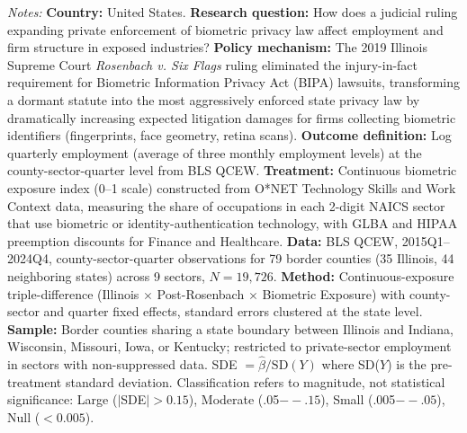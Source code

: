 \begin{table}[htbp]
\begin{tablenotes}[flushleft]
\item \textit{Notes:} \textbf{Country:} United States. \textbf{Research question:} How does a judicial ruling expanding private enforcement of biometric privacy law affect employment and firm structure in exposed industries? \textbf{Policy mechanism:} The 2019 Illinois Supreme Court \textit{Rosenbach v. Six Flags} ruling eliminated the injury-in-fact requirement for Biometric Information Privacy Act (BIPA) lawsuits, transforming a dormant statute into the most aggressively enforced state privacy law by dramatically increasing expected litigation damages for firms collecting biometric identifiers (fingerprints, face geometry, retina scans). \textbf{Outcome definition:} Log quarterly employment (average of three monthly employment levels) at the county-sector-quarter level from BLS QCEW. \textbf{Treatment:} Continuous biometric exposure index (0--1 scale) constructed from O*NET Technology Skills and Work Context data, measuring the share of occupations in each 2-digit NAICS sector that use biometric or identity-authentication technology, with GLBA and HIPAA preemption discounts for Finance and Healthcare. \textbf{Data:} BLS QCEW, 2015Q1--2024Q4, county-sector-quarter observations for 79 border counties (35 Illinois, 44 neighboring states) across 9 sectors, $N = 19{,}726$. \textbf{Method:} Continuous-exposure triple-difference (Illinois $\times$ Post-Rosenbach $\times$ Biometric Exposure) with county-sector and quarter fixed effects, standard errors clustered at the state level. \textbf{Sample:} Border counties sharing a state boundary between Illinois and Indiana, Wisconsin, Missouri, Iowa, or Kentucky; restricted to private-sector employment in sectors with non-suppressed data. SDE $= \hat{\beta} / \text{SD}(Y)$ where SD($Y$) is the pre-treatment standard deviation. Classification refers to magnitude, not statistical significance: Large ($|$SDE$| > 0.15$), Moderate (.05$--.15$), Small (.005$--.05$), Null ($< 0.005$).
\end{tablenotes}
\end{table}
